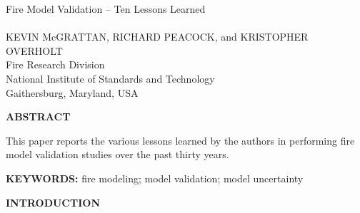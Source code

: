 \documentclass[fleqn,b5paper]{article}
\begin{document}
\renewcommand{\thefootnote}{\sf \arabic{footnote}}
\renewcommand{\d}{\mathrm{d}}
\renewcommand{\labelitemi}{{\scriptsize $\bullet$}}
\renewcommand{\labelitemii}{{\scriptsize $\bullet$}}




\begin{flushleft}
{\helvb Fire Model Validation -- Ten Lessons Learned}\\
\hspace{1in}\\
\helvn KEVIN McGRATTAN\footnotemark[1], RICHARD PEACOCK\footnotemark[1], and KRISTOPHER OVERHOLT\footnotemark[1]  \\
\footnotemark[1] Fire Research Division \\
National Institute of Standards and Technology \\
Gaithersburg, Maryland, USA
\end{flushleft}
\rm

\vspace{\parskip}
{\bf ABSTRACT}

This paper reports the various lessons learned by the authors in performing fire model validation studies over the past thirty years.

\vspace{\parskip}
{\bf KEYWORDS:} fire modeling; model validation; model uncertainty

\vspace{\parskip}
{\bf INTRODUCTION}
\end{document}
